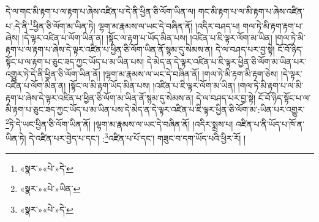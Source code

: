 དེ་ལ་གང་མི་རྟག་པ་ལ་རྟག་པ་ཞེས་འཛིན་པ་དེ་ནི་ཕྱིན་ཅི་ལོག་ཡིན་ལ། གང་མི་རྟག་པ་ལ་མི་རྟག་པ་ཞེས་འཛིན་པ་:དེ་ནི་\footnote{«སྣར་»«པེ་»དེ་}ཕྱིན་ཅི་ལོག་མ་ཡིན་ཏེ། ལྷག་མ་རྣམས་ལ་ཡང་དེ་བཞིན་ནོ། །འདིར་བཤད་པ། གལ་ཏེ་མི་རྟག་རྟག་པ་ཞེས། །དེ་ལྟར་འཛིན་པ་ལོག་ཡིན་ན། །སྟོང་ལ་རྟག་པ་ཡོད་མིན་པས། །འཛིན་པ་ཇི་ལྟར་ལོག་མ་ཡིན། །གལ་ཏེ་མི་རྟག་པ་ལ་རྟག་པ་ཞེས་དེ་ལྟར་འཛིན་པ་ཕྱིན་ཅི་ལོག་ཡིན་ནོ་སྙམ་དུ་སེམས་ན། དེ་ལ་བཤད་པར་བྱ་སྟེ། ངོ་བོ་ཉིད་སྟོང་པ་ལ་རྟག་པ་ཅུང་ཟད་ཀྱང་ཡོད་པ་མ་ཡིན་པས། དེ་མེད་ན་དེ་ལྟར་འཛིན་པ་ཇི་ལྟར་ཕྱིན་ཅི་ལོག་མ་ཡིན་པར་འགྱུར་ཏེ་དེ་ནི་ཕྱིན་ཅི་ལོག་ཡིན་ནོ། །ལྷག་མ་རྣམས་ལ་ཡང་དེ་བཞིན་ནོ། །གལ་ཏེ་མི་རྟག་མི་རྟག་ཅེས། །དེ་ལྟར་འཛིན་པ་ལོག་མིན་ན། །སྟོང་ལ་མི་རྟག་ཡོད་མིན་པས། །འཛིན་པ་ཇི་ལྟར་ལོག་མ་ཡིན། །གལ་ཏེ་མི་རྟག་པ་ལ་མི་རྟག་པ་ཞེས་དེ་ལྟར་འཛིན་པ་ཕྱིན་ཅི་ལོག་མ་ཡིན་ནོ་སྙམ་དུ་སེམས་ན། དེ་ལ་བཤད་པར་བྱ་སྟེ། ངོ་བོ་ཉིད་སྟོང་པ་ལ་མི་རྟག་པ་ཅུང་ཟད་ཀྱང་ཡོད་པ་མ་ཡིན་པས་དེ་མེད་ན་དེ་ལྟར་འཛིན་པ་ཇི་ལྟར་ཕྱིན་ཅི་ལོག་མ་:ཡིན་པར་འགྱུར་\footnote{«སྣར་»«པེ་»ཡིན་}ཏེ་དེ་ཡང་ཕྱིན་ཅི་ལོག་ཡིན་ནོ། །ལྷག་མ་རྣམས་ལ་ཡང་དེ་བཞིན་ནོ། །འདིར་སྨྲས་པ། འཛིན་པ་ནི་ཡོད་པ་ཁོ་ན་ཡིན་ཏེ། དེ་འཛིན་པར་བྱེད་པ་དང་། :\footnote{«སྣར་»«པེ་»དེ་}འཛིན་པ་པོ་དང་། གཟུང་བ་དག་ཡོད་པའི་ཕྱིར་རོ། །
